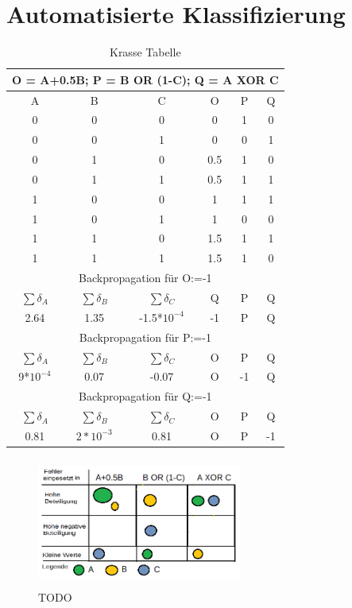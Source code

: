 \section{Automatisierte Klassifizierung}
\begin{table}
\centering
\begin{tabular}{|c|c|c||c|c|c|}

	\hline
	\multicolumn{6}{|c|}{O = A+0.5B; P = B OR (1-C); Q = A XOR C} \\	\hline
	A & B & C & O & P & Q \\ \hline
	0 & 0 & 0 & 0 & 1 & 0\\ \hline
	0 & 0 & 1 & 0 & 0 & 1\\ \hline
	0 & 1 & 0 & 0.5 & 1 & 0\\ \hline
	0 & 1 & 1 & 0.5 & 1 & 1\\ \hline
	1 & 0 & 0 & 1   & 1 & 1\\ \hline
	1 & 0 & 1 & 1   & 0 & 0\\ \hline
	1 & 1 & 0 & 1.5 & 1 & 1\\ \hline
	1 & 1 & 1 & 1.5 & 1 & 0\\ \hline \hline
	\multicolumn{6}{|c|}{Backpropagation für O:=-1} \\ \hline
	$\sum \delta_{A} $ & $\sum \delta_{B} $ &$\sum \delta_{C} $ & Q & P & Q \\ \hline
	2.64 & 1.35 & -1.5*$ 10^{-4} $ & -1 & P & Q \\ \hline
	\multicolumn{6}{|c|}{Backpropagation für P:=-1} \\ \hline
	$\sum \delta_{A} $ & $\sum \delta_{B} $ &$\sum \delta_{C} $ & O & P & Q \\ \hline
	9*$ 10^{-4} $& 0.07 & -0.07 & O & -1 & Q \\ \hline
	\multicolumn{6}{|c|}{Backpropagation für Q:=-1} \\ \hline
	$\sum \delta_{A} $ & $\sum \delta_{B} $ &$\sum \delta_{C} $ & O & P & Q \\ \hline
	0.81 & $ 2*10^{-3} $ & 0.81 & O & P & -1 \\ \hline

\end{tabular}
	\caption{Krasse Tabelle}
\end{table}
\begin{figure}
	\centering
	\includegraphics[width=0.6\textwidth, height=160px]{pics/diagramm.png}	
	\caption{TODO }
	\label{img:diagramm}
\end{figure}
